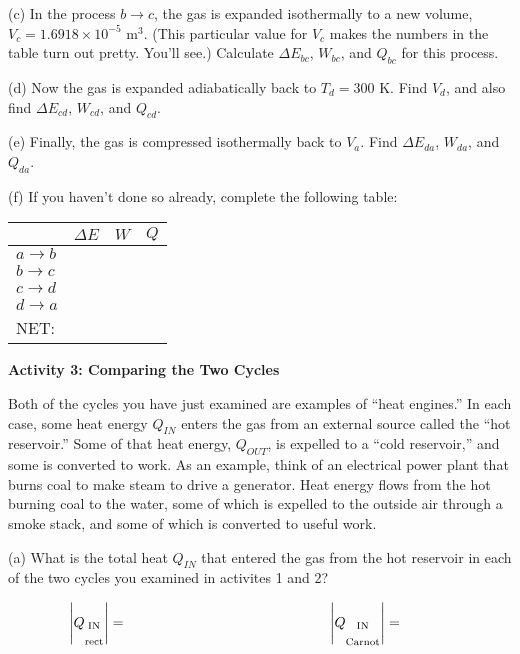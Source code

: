 \pagebreak
(c) In the process $b \rightarrow c$, the gas is expanded isothermally to a new volume, $V_c=1.6918 \times 10^{-5}$ m$^3$.  (This particular value for $V_c$ makes the numbers in the table turn out pretty.  You'll see.)  Calculate $\Delta E_{bc}$, $W_{bc}$, and $Q_{bc}$ for this process.  
\answerspace{1.6in}

(d) Now the gas is expanded adiabatically back to $T_d=300$ K.  Find $V_d$, and also find  $\Delta E_{cd}$, $W_{cd}$, and $Q_{cd}$.
\answerspace{2.0in}


(e) Finally, the gas is compressed isothermally back to $V_a$.  Find $\Delta E_{da}$, $W_{da}$, and $Q_{da}$.  
\answerspace{1.6in}



(f) If you haven't done so already, complete the following table:
\vspace{0.1 in}

{\renewcommand{\arraystretch}{2.0}
\begin{tabular}{| C{1in} |C{1in} | C{1in} | C{1in} |}
\hline
& $\Delta E$ & $W$ & $Q$ \\ \hline
$a \rightarrow b$ & & & \\ \hline
$b \rightarrow c$ & & & \\ \hline
$c \rightarrow d$ & & & \\ \hline
$d \rightarrow a$ & & & \\
\hhline{|=|=|=|=|}
NET: & & & \\ \hline
\end{tabular}
}

\pagebreak
\textbf{Activity 3: Comparing the Two Cycles}

Both of the cycles you have just examined are examples of ``heat engines.''  In each case, some heat energy $Q_{IN}$ enters the gas from an external source called the ``hot reservoir.''   Some of that heat energy, $Q_{OUT}$, is expelled to a ``cold reservoir,'' and some is converted to work.    As an example, think of an electrical power plant that burns coal to make steam to drive a generator.  Heat energy flows from the hot burning coal to the water, some of which is expelled to the outside air through a smoke stack, and some of which is converted to useful work.

(a)  What is the total heat $Q_{IN}$ that entered the gas from the hot reservoir in each of the two cycles you examined in activites 1 and 2?

\begin{displaymath}
\hspace{-0.5in} \left| Q_{\substack{\textrm{IN} \\ \\ \textrm{rect}}} \right| =
\hspace{2in} \left| Q_{\substack{\textrm{IN} \\ \\ \textrm{Carnot}}} \right|=
\end{displaymath}

